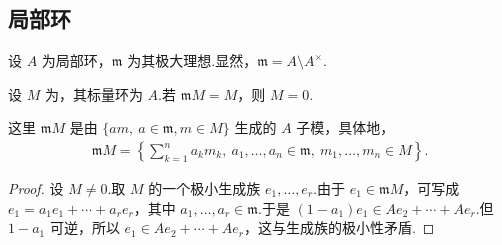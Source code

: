 \subsection{局部环}\label{sec:nt-2-1-4}
设 $A$ 为局部环，$\mathfrak m$ 为其极大理想.显然，$\mathfrak m=A\setminus A^\times$.
\begin{lemma*}[Nakayama]
设 $M$ 为，其标量环为 $A$.若 $\mathfrak mM=M$，则 $M=0$.
\end{lemma*}
这里 $\mathfrak mM$ 是由 $\{am,\ a\in\mathfrak m,m\in M\}$ 生成的 $A$ 子模，具体地，
\begin{align*}
\mathfrak mM=\left\{\sum_{k=1}^n a_km_k,\ a_1,\ldots,a_n\in\mathfrak m,\ m_1,\ldots,m_n\in M\right\}.
\end{align*}
\begin{proof}
设 $M\ne0$.取 $M$ 的一个极小生成族 $e_1,\ldots,e_r$.由于 $e_1\in\mathfrak mM$，可写成 $e_1=a_1e_1+\cdots+a_re_r$，其中 $a_1,\ldots,a_r\in\mathfrak m$.于是 $(1-a_1)e_1\in Ae_2+\cdots+Ae_r$.但 $1-a_1$ 可逆，所以 $e_1\in Ae_2+\cdots+Ae_r$，这与生成族的极小性矛盾.
\end{proof}

